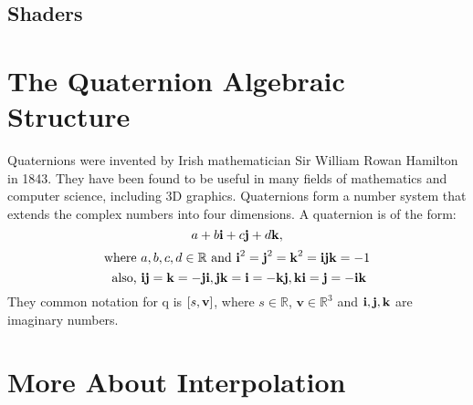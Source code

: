 \documentclass[10pt]{article}
\def\real{\mathbb{R}}
\def\bv{\text{\textbf{v}}}
\def\bi{\text{\textbf{i}}}
\def\bj{\text{\textbf{j}}}
\def\bk{\text{\textbf{k}}}
\begin{document}
\subsection{Shaders}

\appendix
\section{The Quaternion Algebraic Structure}
Quaternions were invented by Irish mathematician Sir William Rowan Hamilton in
1843. They have been found to be useful in many fields of mathematics and computer
science, including 3D graphics.
Quaternions form a number system that extends the complex numbers into four
dimensions. A quaternion is of the form: \[ a + b\bi + c\bj + d\bk, \] \[ \text{where
} a,b,c,d \in \real \text{ and } \bi^2 = \bj^2 = \bk^2 = \bi\bj\bk = -1 \] \[ \text{ also, }
\bi\bj = \bk = -\bj\bi, \bj\bk = \bi = -\bk\bj, \bk\bi = \bj = -\bi\bk \]
They common notation for q is $[s,\bv]$, where $s \in \real $, $\textbf{v} \in
\real^3$ and $\bi, \bj, \bk$ are imaginary numbers. 

\section{More About Interpolation}
   
\end{document}
